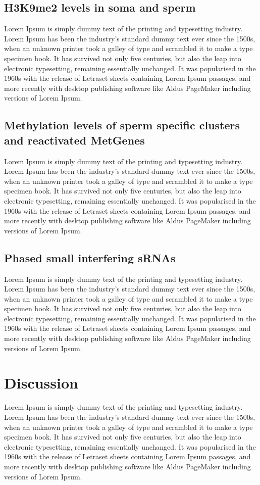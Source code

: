 \subsection{H3K9me2 levels in soma and sperm}
Lorem Ipsum is simply dummy text of the printing and typesetting industry. Lorem Ipsum has been the industry's standard dummy text ever since the 1500s, when an unknown printer took a galley of type and scrambled it to make a type specimen book. It has survived not only five centuries, but also the leap into electronic typesetting, remaining essentially unchanged. It was popularised in the 1960s with the release of Letraset sheets containing Lorem Ipsum passages, and more recently with desktop publishing software like Aldus PageMaker including versions of Lorem Ipsum.

\subsection{Methylation levels of sperm specific clusters and reactivated MetGenes}
Lorem Ipsum is simply dummy text of the printing and typesetting industry. Lorem Ipsum has been the industry's standard dummy text ever since the 1500s, when an unknown printer took a galley of type and scrambled it to make a type specimen book. It has survived not only five centuries, but also the leap into electronic typesetting, remaining essentially unchanged. It was popularised in the 1960s with the release of Letraset sheets containing Lorem Ipsum passages, and more recently with desktop publishing software like Aldus PageMaker including versions of Lorem Ipsum.

\subsection{Phased small interfering sRNAs}
Lorem Ipsum is simply dummy text of the printing and typesetting industry. Lorem Ipsum has been the industry's standard dummy text ever since the 1500s, when an unknown printer took a galley of type and scrambled it to make a type specimen book. It has survived not only five centuries, but also the leap into electronic typesetting, remaining essentially unchanged. It was popularised in the 1960s with the release of Letraset sheets containing Lorem Ipsum passages, and more recently with desktop publishing software like Aldus PageMaker including versions of Lorem Ipsum.


\section{Discussion}
Lorem Ipsum is simply dummy text of the printing and typesetting industry. Lorem Ipsum has been the industry's standard dummy text ever since the 1500s, when an unknown printer took a galley of type and scrambled it to make a type specimen book. It has survived not only five centuries, but also the leap into electronic typesetting, remaining essentially unchanged. It was popularised in the 1960s with the release of Letraset sheets containing Lorem Ipsum passages, and more recently with desktop publishing software like Aldus PageMaker including versions of Lorem Ipsum.

